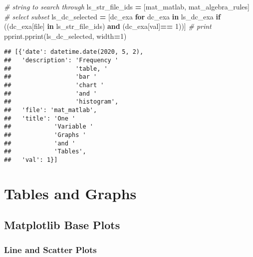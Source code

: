 \documentclass[
]{book}
\newenvironment{Shaded}{\begin{snugshade}}{\end{snugshade}}
\newcommand{\CommentTok}[1]{\textcolor[rgb]{0.56,0.35,0.01}{\textit{#1}}}
\newcommand{\ControlFlowTok}[1]{\textcolor[rgb]{0.13,0.29,0.53}{\textbf{#1}}}
\newcommand{\DecValTok}[1]{\textcolor[rgb]{0.00,0.00,0.81}{#1}}
\newcommand{\KeywordTok}[1]{\textcolor[rgb]{0.13,0.29,0.53}{\textbf{#1}}}
\newcommand{\NormalTok}[1]{#1}
\newcommand{\OperatorTok}[1]{\textcolor[rgb]{0.81,0.36,0.00}{\textbf{#1}}}
\newcommand{\StringTok}[1]{\textcolor[rgb]{0.31,0.60,0.02}{#1}}
\begin{document}
\begin{Shaded}
\begin{Highlighting}[]
\CommentTok{\# string to search through}
\NormalTok{ls\_str\_file\_ids }\OperatorTok{=}\NormalTok{ [}\StringTok{\textquotesingle{}mat\_matlab\textquotesingle{}}\NormalTok{, }\StringTok{\textquotesingle{}mat\_algebra\_rules\textquotesingle{}}\NormalTok{]}
\CommentTok{\# select subset}
\NormalTok{ls\_dc\_selected }\OperatorTok{=}\NormalTok{ [dc\_exa}
                  \ControlFlowTok{for}\NormalTok{ dc\_exa }\KeywordTok{in}\NormalTok{ ls\_dc\_exa}
                  \ControlFlowTok{if}\NormalTok{ ((dc\_exa[}\StringTok{\textquotesingle{}file\textquotesingle{}}\NormalTok{] }\KeywordTok{in}\NormalTok{ ls\_str\_file\_ids) }
                      \KeywordTok{and}
\NormalTok{                      (dc\_exa[}\StringTok{\textquotesingle{}val\textquotesingle{}}\NormalTok{]}\OperatorTok{==} \DecValTok{1}\NormalTok{))]}
\CommentTok{\# print}
\NormalTok{pprint.pprint(ls\_dc\_selected, width}\OperatorTok{=}\DecValTok{1}\NormalTok{)}
\end{Highlighting}
\end{Shaded}

\begin{verbatim}
## [{'date': datetime.date(2020, 5, 2),
##   'description': 'Frequency '
##                  'table, '
##                  'bar '
##                  'chart '
##                  'and '
##                  'histogram',
##   'file': 'mat_matlab',
##   'title': 'One '
##            'Variable '
##            'Graphs '
##            'and '
##            'Tables',
##   'val': 1}]
\end{verbatim}

\hypertarget{tables-and-graphs}{%
\chapter{Tables and Graphs}\label{tables-and-graphs}}

\hypertarget{matplotlib-base-plots}{%
\section{Matplotlib Base Plots}\label{matplotlib-base-plots}}

\hypertarget{line-and-scatter-plots}{%
\subsection{Line and Scatter Plots}\label{line-and-scatter-plots}}
\end{document}
